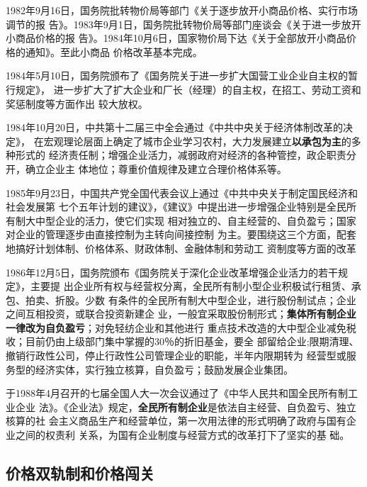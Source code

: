 1982年9月16日，国务院批转物价局等部门《关于逐步放开小商品价格、实行市场调节的报
告》。1983年9月1日，国务院批转物价局等部门座谈会《关于进一步放开小商品价格的报
告》。1984年10月6日，国家物价局下达《关于全部放开小商品价格的通知》。至此小商品
价格改革基本完成。


1984年5月10日，国务院颁布了《国务院关于进一步扩大国营工业企业自主权的暂行规定》，
进一步扩大了扩大企业和厂长（经理）的自主权，在招工、劳动工资和奖惩制度等方面作出
较大放权。

1984年10月20日，中共第十二届三中全会通过《中共中央关于经济体制改革的决定》，
在宏观理论层面上确定了城市企业学习农村，大力发展建立\textbf{以承包为主}的多种形式的
经济责任制；增强企业活力，减弱政府对经济的各种管控，政企职责分开，确立企业主
体地位；尊重价值规律及建立合理价格体系等。

1985年9月23日，中国共产党全国代表会议上通过《中共中央关于制定国民经济和社会发展第
七个五年计划的建议》，《建议》中提出进一步增强企业特别是全民所有制大中型企业的活力，使它们实现
相对独立的、自主经营的、自负盈亏；国家对企业的管理逐步由直接控制为主转向间接控制
为主。要围绕这三个方面，配套地搞好计划体制、价格体系、财政体制、金融体制和劳动工
资制度等方面的改革

1986年12月5日，国务院颁布《国务院关于深化企业改革增强企业活力的若干规定》，主要提
出企业所有权与经营权分离，全民所有制小型企业积极试行租赁、承包、拍卖、折股。少数
有条件的全民所有制大中型企业，进行股份制试点；企业之间互相投资，或联合投资新建企
业，一般宜采取股份制形式；\textbf{集体所有制企业一律改为自负盈亏}；对免轻纺企业和其他进行
重点技术改造的大中型企业减免税收；目前仍由上级部门集中掌握的30％的折旧基金，要全
部留给企业;限期清理、撤销行政性公司，停止行政性公司管理企业的职能，半年内限期转为
经营型或服务型的经济实体，实行独立核算，自负盈亏；鼓励发展企业集团。

于1988年4月召开的七届全国人大一次会议通过了《中华人民共和国全民所有制工业企业
法》。《企业法》规定，\textbf{全民所有制企业}是依法自主经营、自负盈亏、独立核算的社
会主义商品生产和经营单位，第一次用法律的形式明确了政府与国有企业之间的权责利
关系，为国有企业制度与经营方式的改革打下了坚实的基
础。


\subsection{价格双轨制和价格闯关}
\label{sec:qishuanggui}

